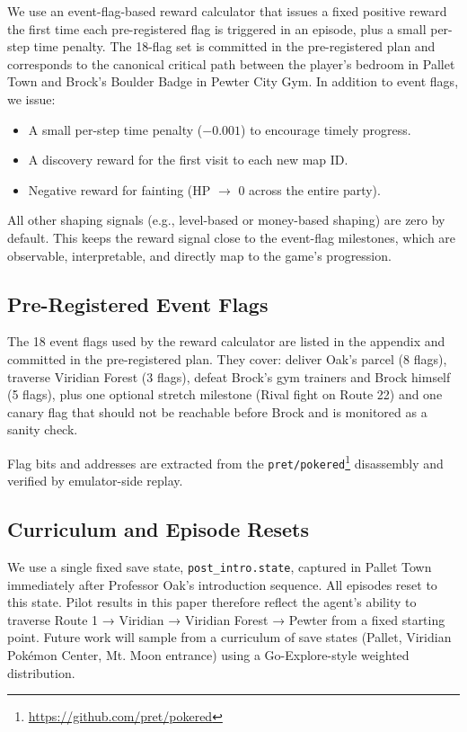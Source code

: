 We use an event-flag-based reward calculator that issues a fixed
positive reward the first time each pre-registered flag is triggered
in an episode, plus a small per-step time penalty.  The 18-flag set is
committed in the pre-registered plan and corresponds to the canonical
critical path between the player's bedroom in Pallet Town and Brock's
Boulder Badge in Pewter City Gym.  In addition to event flags, we
issue:
%
\begin{itemize}
\item A small per-step time penalty ($-0.001$) to encourage timely
  progress.
\item A discovery reward for the first visit to each new map ID.
\item Negative reward for fainting (HP $\to$ 0 across the entire
  party).
\end{itemize}
%
All other shaping signals (e.g., level-based or money-based shaping)
are zero by default.  This keeps the reward signal close to the
event-flag milestones, which are observable, interpretable, and
directly map to the game's progression.

\subsection{Pre-Registered Event Flags}
\label{sec:events}

The 18 event flags used by the reward calculator are listed in the
appendix and committed in the pre-registered plan.  They cover:
deliver Oak's parcel (8 flags), traverse Viridian Forest (3 flags),
defeat Brock's gym trainers and Brock himself (5 flags), plus one
optional stretch milestone (Rival fight on Route 22) and one canary
flag that should not be reachable before Brock and is monitored as a
sanity check.

Flag bits and addresses are extracted from the
\texttt{pret/pokered}\footnote{\url{https://github.com/pret/pokered}}
disassembly and verified by emulator-side replay.

\subsection{Curriculum and Episode Resets}
\label{sec:curriculum}

We use a single fixed save state, \texttt{post\_intro.state}, captured
in Pallet Town immediately after Professor Oak's introduction
sequence.  All episodes reset to this state.  Pilot results in this
paper therefore reflect the agent's ability to traverse Route 1 →
Viridian → Viridian Forest → Pewter from a fixed starting point.
Future work will sample from a curriculum of save states (Pallet,
Viridian Pok\'emon Center, Mt. Moon entrance) using a Go-Explore-style
weighted distribution.

